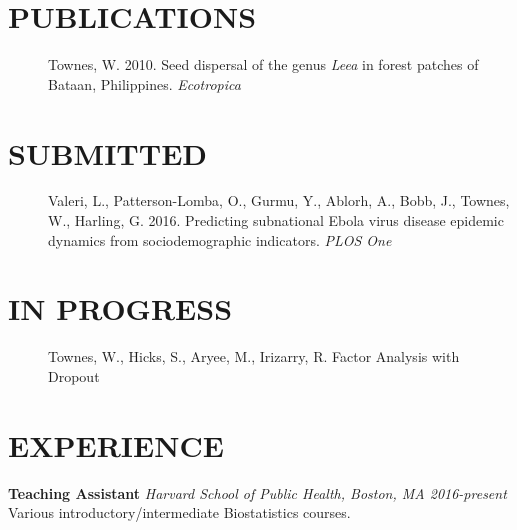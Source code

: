 \documentclass[line, margin]{res}
\begin{document}
\begin{resume}
\section{PUBLICATIONS}
\begin{description}
\item[] Townes, W. 2010. Seed dispersal of the genus \textit{Leea} in forest patches of Bataan, Philippines. \textit{Ecotropica}
\end{description}

\section{SUBMITTED}
\begin{description}
\item[] Valeri, L., Patterson-Lomba, O., Gurmu, Y., Ablorh, A., Bobb, J., Townes, W., Harling, G. 2016. Predicting subnational Ebola virus disease epidemic dynamics from sociodemographic indicators. \textit{PLOS One}
\end{description}

\section{IN PROGRESS}
\begin{description}
\item[] Townes, W., Hicks, S., Aryee, M., Irizarry, R. Factor Analysis with Dropout
\end{description}

\section{EXPERIENCE}
\textbf{Teaching Assistant} \textit{Harvard School of Public Health, Boston, MA \hfill 2016-present} \\
Various introductory/intermediate Biostatistics courses.


\end{resume}
\end{document}
